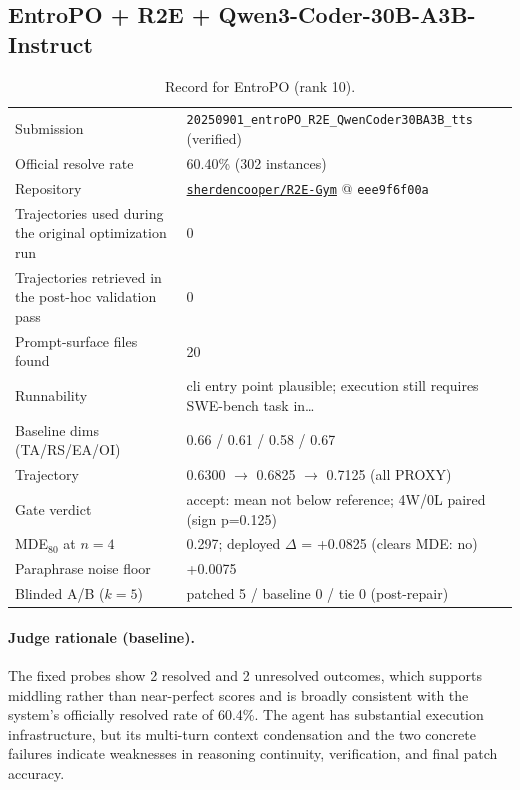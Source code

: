 \subsection{EntroPO + R2E + Qwen3-Coder-30B-A3B-Instruct}
\label{app:agent10}
\begin{table}[h]\centering\scriptsize
\caption{Record for EntroPO (rank 10).}
\begin{tabular}{lp{8.2cm}}\toprule
Submission & \texttt{20250901\_\allowbreak{}entroPO\_\allowbreak{}R2E\_\allowbreak{}QwenCoder30BA3B\_\allowbreak{}tts} (verified) \\
Official resolve rate & 60.40\% (302 instances) \\
Repository & \href{https://github.com/sherdencooper/R2E-Gym}{\texttt{sherdencooper/R2E-Gym}} @ \texttt{eee9f6f00a} \\
Trajectories used during the original optimization run & 0 \\
Trajectories retrieved in the post-hoc validation pass & 0 \\
Prompt-surface files found & 20 \\
Runnability & cli entry point plausible; execution still requires SWE-bench task in\ldots{} \\
Baseline dims (TA/RS/EA/OI) & 0.66 / 0.61 / 0.58 / 0.67 \\
Trajectory & 0.6300 $\to$ 0.6825 $\to$ 0.7125 (all PROXY) \\
Gate verdict & accept: mean not below reference; 4W/0L paired (sign p=0.125) \\
MDE$_{80}$ at $n{=}4$ & 0.297; deployed $\Delta$ = +0.0825 (clears MDE: no) \\
Paraphrase noise floor & +0.0075 \\
Blinded A/B ($k{=}5$) & patched 5 / baseline 0 / tie 0 (post-repair) \\
\bottomrule\end{tabular}\end{table}
\paragraph{Judge rationale (baseline).}
The fixed probes show 2 resolved and 2 unresolved outcomes, which supports middling rather than near-perfect scores and is broadly consistent with the system's officially resolved rate of 60.4\%. The agent has substantial execution infrastructure, but its multi-turn context condensation and the two concrete failures indicate weaknesses in reasoning continuity, verification, and final patch accuracy.
